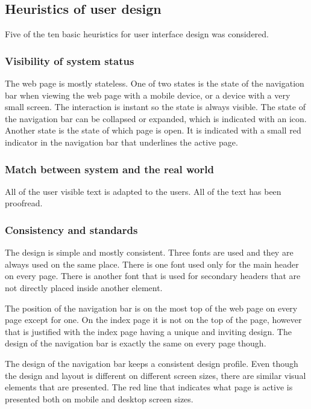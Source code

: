 \documentclass[a4paper]{scrartcl}
\begin{document}
\subsection{Heuristics of user design}

Five of the ten basic heuristics for user interface design was considered.

\subsubsection{Visibility of system status}
The web page is mostly stateless. One of two states is the state of the navigation bar when viewing the web page with a mobile device, or a device with a very small screen. The interaction is instant so the state is always visible. The state of the navigation bar can be collapsed or expanded, which is indicated with an icon. Another state is the state of which page is open. It is indicated with a small red indicator in the navigation bar that underlines the active page.

\subsubsection{Match between system and the real world}
All of the user visible text is adapted to the users. All of the text has been proofread.

\subsubsection{Consistency and standards}
The design is simple and mostly consistent. Three fonts are used and they are always used on the same place. There is one font used only for the main header on every page. There is another font that is used for secondary headers that are not directly placed inside another element.

The position of the navigation bar is on the most top of the web page on every page except for one. On the index page it is not on the top of the page, however that is justified with the index page having a unique and inviting design. The design of the navigation bar is exactly the same on every page though.

The design of the navigation bar keeps a consistent design profile. Even though the design and layout is different on different screen sizes, there are similar visual elements that are presented. The red line that indicates what page is active is presented both on mobile and desktop screen sizes.
\end{document}
